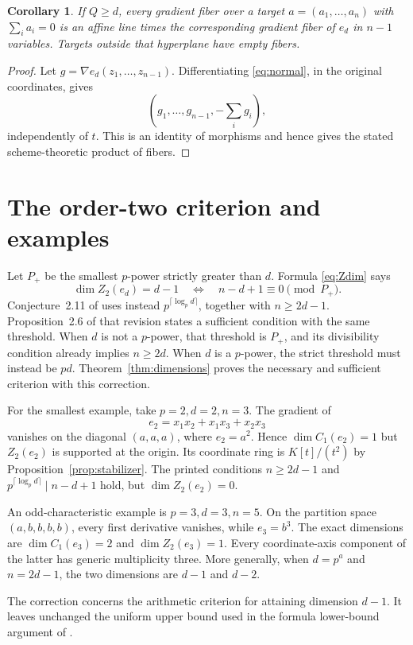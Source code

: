 \documentclass[11pt]{article}
\newtheorem{corollary}[theorem]{Corollary}
\theoremstyle{remark}
\begin{document}
\begin{corollary}\label{cor:gradientfibers}
If $Q\ge d$, every gradient fiber over a target
$a=(a_1,\ldots,a_n)$ with $\sum_i a_i=0$ is an affine line
times the corresponding gradient fiber of $e_d$ in $n-1$
variables. Targets outside that hyperplane have empty fibers.
\end{corollary}
\begin{proof}
Let $g=\nabla e_d(z_1,\ldots,z_{n-1})$. Differentiating
\eqref{eq:normal}, in the original coordinates, gives
\[
 (g_1,\ldots,g_{n-1},-\textstyle\sum_i g_i),
\]
independently of $t$.
This is an identity of morphisms and hence gives the stated
scheme-theoretic product of fibers.
\end{proof}

\section{The order-two criterion and examples}\label{sec:comparison}

Let $P_+$ be the smallest $p$-power strictly greater than $d$.
Formula \eqref{eq:Zdim} says
\[
 \dim Z_2(e_d)=d-1\quad\Longleftrightarrow\quad
 n-d+1\equiv0\pmod{P_+}.
\]
Conjecture~2.11 of \cite{Orzel} uses instead
$p^{\lceil\log_p d\rceil}$, together with $n\ge2d-1$.
Proposition~2.6 of that revision states a sufficient condition
with the same threshold. When $d$ is not a $p$-power, that threshold is
$P_+$, and its divisibility condition already implies $n\ge2d$.
When $d$ is a $p$-power, the strict threshold must instead be
$pd$. Theorem~\ref{thm:dimensions} proves the necessary and
sufficient criterion with this correction.

For the smallest example, take $p=2,d=2,n=3$. The gradient of
\[
 e_2=x_1x_2+x_1x_3+x_2x_3
\]
vanishes on the diagonal $(a,a,a)$, where $e_2=a^2$. Hence
$\dim C_1(e_2)=1$ but $Z_2(e_2)$ is supported at the origin.
Its coordinate ring is $K[t]/(t^2)$ by
Proposition~\ref{prop:stabilizer}. The printed conditions
$n\ge2d-1$ and $p^{\lceil\log_p d\rceil}\mid n-d+1$ hold,
but $\dim Z_2(e_2)=0$.

An odd-characteristic example is $p=3,d=3,n=5$. On the partition
space $(a,b,b,b,b)$, every first derivative vanishes, while
$e_3=b^3$. The exact dimensions are $\dim C_1(e_3)=2$ and
$\dim Z_2(e_3)=1$. Every coordinate-axis component of the latter
has generic multiplicity three. More generally, when $d=p^a$
and $n=2d-1$, the two dimensions are $d-1$ and $d-2$.

The correction concerns the arithmetic criterion for attaining
dimension $d-1$. It leaves unchanged the uniform upper bound used
in the formula lower-bound argument of \cite{Orzel}.
\end{document}
